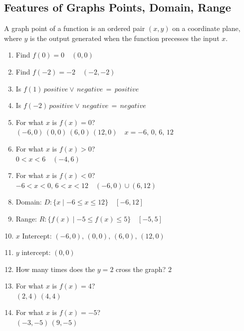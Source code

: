 \subsection{Features of Graphs Points, Domain, Range}
\begin{definition}
	A graph point of a function is an ordered pair $(x, y)$ on a coordinate plane, where $y$ is the output generated when the function precesses the input $x$.
\end{definition}
\begin{example}[Graphs]
	\hfill
	\begin{center}
	\end{center}
	\begin{enumerate}
		\item Find $f(0) = 0 \quad (0, 0)$
		\item Find $f(-2) = -2 \quad (-2, -2)$
		\item Is $f(1) \, positive \lor \, negative \, = \, positive$
		\item Is $f(-2) \, positive \lor \, negative \, = \, negative$
		\item For what $x$ is $f(x) = 0$? \\
		$(-6, 0)\, (0, 0)\, (6, 0)\, (12, 0) \quad x = -6,\, 0,\, 6,\, 12$
		\item For what $x$ is $f(x) > 0$? \\
		$0 < x < 6 \quad (-4, 6)$
		\item For what $x$ is $f(x) < 0$? \\
		$-6 < x < 0,\, 6 < x < 12 \quad (-6, 0) \cup (6, 12)$
		\item Domain: $D : \{x \mid -6 \le x \le 12\} \quad [-6, 12]$
		\item Range: $R : \{f(x)  \mid -5 \le f(x) \le 5\} \quad [-5, 5]$
		\item $x$ Intercept: $(-6, 0), \, (0, 0), \, (6, 0), \, (12, 0)$
		\item $y$ intercept: $(0, 0)$
		\item How many times does the $y = 2$ cross the graph? $2$
		\item For what $x$ is $f(x) = 4$? \\
		$(2, 4)\, (4, 4)$
		\item For what $x$ is $f(x) = -5$? \\
		$(-3, -5)\, (9, -5)$
	\end{enumerate}
\end{example}

